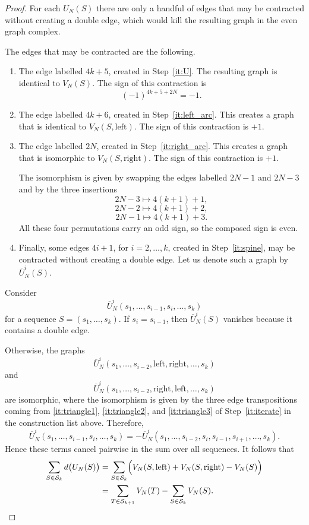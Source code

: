 \documentclass[11pt]{article}
\theoremstyle{definition}
\theoremstyle{plain}
\newcommand{\LeftChoice}{\mathrm{left}}
\newcommand{\RightChoice}{\mathrm{right}}
\begin{document}
\begin{proof}
For each $U_N(S)$ there are only a handful of edges that may be contracted without creating a double edge, which would kill the resulting graph in the even graph complex.

The edges that may be contracted are the following.
\begin{enumerate}[itemsep=0.35em, topsep=0.35em]
\item The edge labelled $4k+5$, created in Step~\ref{it:U}. The resulting graph is identical to $V_N(S)$. The sign of this contraction is
\[
(-1)^{4k+5+2N} = -1.
\]

\item The edge labelled $4k+6$, created in Step~\ref{it:left_arc}. This creates a graph that is identical to $V_N(S,\LeftChoice)$. The sign of this contraction is $+1$.

\item The edge labelled $2N$, created in Step~\ref{it:right_arc}. This creates a graph that is isomorphic to $V_N(S,\RightChoice)$. The sign of this contraction is $+1$.

The isomorphism is given by swapping the edges labelled $2N-1$ and $2N-3$ and by the three insertions
\[
2N-3 \mapsto 4(k+1)+1,
\]
\[
2N-2 \mapsto 4(k+1)+2,
\]
\[
2N-1 \mapsto 4(k+1)+3.
\]
All these four permutations carry an odd sign, so the composed sign is even.

\item Finally, some edges $4i+1$, for $i=2,\dots,k$, created in Step~\ref{it:spine}, may be contracted without creating a double edge. Let us denote such a graph by $\overline{U}_N^i(S)$.
\end{enumerate}

Consider
\[
\overline{U}_N^i(s_1,\dots,s_{i-1},s_i,\dots,s_k)
\]
for a sequence $S=(s_1,\dots,s_k)$. If $s_i=s_{i-1}$, then $\overline{U}_N^i(S)$ vanishes because it contains a double edge.

Otherwise, the graphs
\[
\overline{U}_N^i(s_1,\dots,s_{i-2},\LeftChoice,\RightChoice,\dots,s_k)
\]
and
\[
\overline{U}_N^i(s_1,\dots,s_{i-2},\RightChoice,\LeftChoice,\dots,s_k)
\]
are isomorphic, where the isomorphism is given by the three edge transpositions coming from \ref{it:triangle1}, \ref{it:triangle2}, and \ref{it:triangle3} of Step~\ref{it:iterate} in the construction list above. Therefore,
\[
\overline{U}_N^i(s_1,\dots,s_{i-1},s_i,\dots,s_k)
=
-\overline{U}_N^i(s_1,\dots,s_{i-2},s_i,s_{i-1},s_{i+1},\dots,s_k).
\]
Hence these terms cancel pairwise in the sum over all sequences. It follows that
\[
\begin{aligned}
\sum_{S \in \mathcal{S}_k} d\bigl(U_N(S)\bigr)
&= \sum_{S \in \mathcal{S}_k} \Bigl( V_N(S,\LeftChoice) + V_N(S,\RightChoice) - V_N(S) \Bigr)\\
&= \sum_{T \in \mathcal{S}_{k+1}} V_N(T) - \sum_{S \in \mathcal{S}_k} V_N(S).
\end{aligned}
\]

\end{proof}
\end{document}
